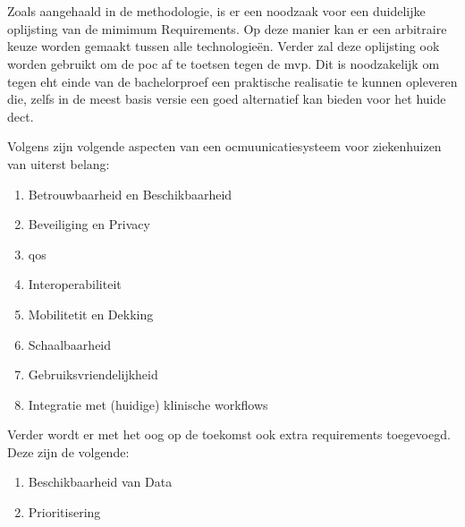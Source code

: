 \chapter{}%
\label{ch:minreq}

Zoals aangehaald in de methodologie, is er een noodzaak voor een duidelijke oplijsting van de mimimum Requirements. Op deze manier kan er een arbitraire keuze worden gemaakt tussen alle technologieën. Verder zal deze oplijsting ook worden gebruikt om de \acrshort{poc} af te toetsen tegen de \acrshort{mvp}. Dit is noodzakelijk om tegen eht einde van de bachelorproef een praktische realisatie te kunnen opleveren die, zelfs in de meest basis versie een goed alternatief kan bieden voor het huide \acrshort{dect}.

Volgens \textcite{Coiera2006} zijn volgende aspecten van een ocmuunicatiesysteem voor ziekenhuizen van uiterst belang:

\begin{enumerate}
    \item Betrouwbaarheid en Beschikbaarheid
    \item Beveiliging en Privacy
    \item \acrfull{qos}
    \item Interoperabiliteit
    \item Mobilitetit en Dekking
    \item Schaalbaarheid
    \item Gebruiksvriendelijkheid
    \item Integratie met (huidige) klinische workflows 
\end{enumerate}

Verder wordt er met het oog op de toekomst ook extra requirements toegevoegd. Deze zijn de volgende:

\begin{enumerate}
    \item Beschikbaarheid van Data
    \item Prioritisering
\end{enumerate}

\section{}
\label{sec:betrouwbaarheid-en-beschikbaarheid}


\section{}
\label{sec:beveiliging-en-privacy}



